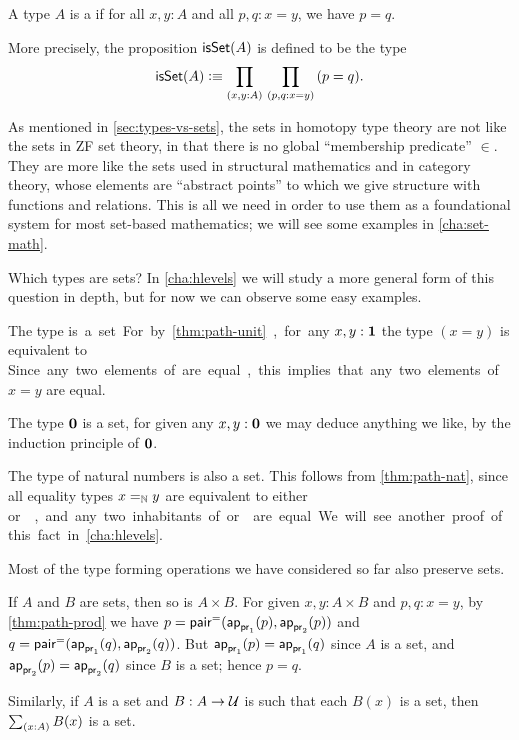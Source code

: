 \begin{defn}\label{defn:set}
  A type $A$ is a 
  if for all $x,y:A$ and all $p,q:x=y$, we have $p=q$.
\end{defn}

More precisely, the proposition $\isset(A)$ is defined to be the type
\[ \isset(A) \defeq \prd{x,y:A}{p,q:x=y} (p=q). \]

As mentioned in \autoref{sec:types-vs-sets},
the sets in homotopy type theory are not like the sets in ZF set theory, in that there is no global ``membership predicate'' $\in$.
They are more like the sets used in structural mathematics and in category theory, whose elements are ``abstract points'' to which we give structure with functions and relations.
This is all we need in order to use them as a foundational system for most set-based mathematics; we will see some examples in \autoref{cha:set-math}.

Which types are sets?
In \autoref{cha:hlevels} we will study a more general form of this question in depth, but for now we can observe some easy examples.

\begin{eg}
  The type \unit is a set.
  For by \autoref{thm:path-unit}, for any $x,y:\unit$ the type $(x=y)$ is equivalent to \unit.
  Since any two elements of \unit are equal, this implies that any two elements of $x=y$ are equal.
\end{eg}

\begin{eg}
  The type $\emptyt$ is a set, for given any $x,y:\emptyt$ we may deduce anything we like, by the induction principle of $\emptyt$.
\end{eg}

\begin{eg}\label{thm:nat-set}
  The type \nat of natural numbers is also a set.
  This follows from \autoref{thm:path-nat}, since all equality types $\id[\nat]xy$ are equivalent to either \unit or \emptyt, and any two inhabitants of \unit or \emptyt are equal.
  We will see another proof of this fact in \autoref{cha:hlevels}.
\end{eg}

Most of the type forming operations we have considered so far also preserve sets.

\begin{eg}\label{thm:isset-prod}
  If $A$ and $B$ are sets, then so is $A\times B$.
  For given $x,y:A\times B$ and $p,q:x=y$, by \autoref{thm:path-prod} we have $p= \pairpath(\projpath1(p),\projpath2(p))$ and $q= \pairpath(\projpath1(q),\projpath2(q))$.
  But $\projpath1(p)=\projpath1(q)$ since $A$ is a set, and $\projpath2(p)=\projpath2(q)$ since $B$ is a set; hence $p=q$.

  Similarly, if $A$ is a set and $B:A\to\type$ is such that each $B(x)$ is a set, then $\sm{x:A} B(x)$ is a set.
\end{eg}

